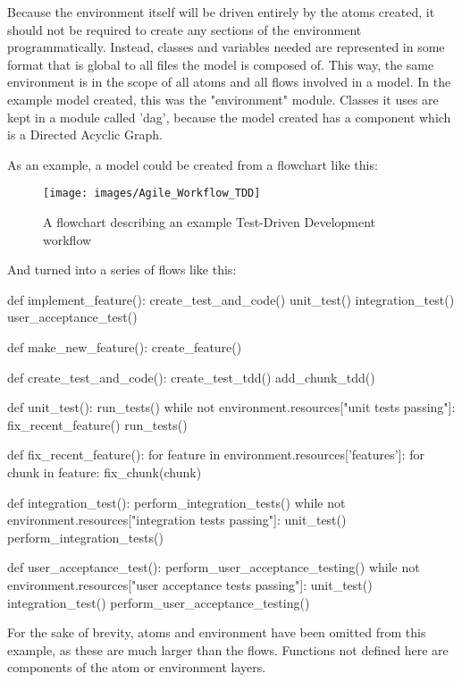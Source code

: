 Because the environment itself will be driven entirely by the atoms created, it should not be required to create any sections of the environment programmatically. Instead, classes and variables needed are represented in some format that is global to all files the model is composed of. This way, the same environment is in the scope of all atoms and all flows involved in a model. In the example model created, this was the "environment" module. Classes it uses are kept in a module called 'dag', because the model created has a component which is a Directed Acyclic Graph. \par

As an example, a model could be created from a flowchart like this: \par

\begin{figure}[H]
    \centering
    \texttt{[image: images/Agile\_Workflow\_TDD]}
    \caption{A flowchart describing an example Test-Driven Development workflow}
    \label{fig:agile_workflow_flowchart_drawio}
\end{figure}\par

And turned into a series of flows like this:  \par

\begin{pyglist}[language = python, encoding = utf8, numbers=left, listingname=\textbf{Code sample}, caption={Sample adaptation from flowchart to Python flows}, numbers=left]
def implement_feature():
    create_test_and_code()
    unit_test()
    integration_test()
    user_acceptance_test()


def make_new_feature():
    create_feature()


def create_test_and_code():
    create_test_tdd()
    add_chunk_tdd()


def unit_test():
    run_tests()
    while not environment.resources["unit tests passing"]:
        fix_recent_feature()
        run_tests()


def fix_recent_feature():
    for feature in environment.resources['features']:
        for chunk in feature:
            fix_chunk(chunk)


def integration_test():
    perform_integration_tests()
    while not environment.resources["integration tests passing"]:
        unit_test()
        perform_integration_tests()


def user_acceptance_test():
    perform_user_acceptance_testing()
    while not environment.resources["user acceptance tests passing"]:
        unit_test()
        integration_test()
        perform_user_acceptance_testing()
\end{pyglist} \par

For the sake of brevity, atoms and environment have been omitted from this example, as these are much larger than the flows. Functions not defined here are components of the atom or environment layers. \par
